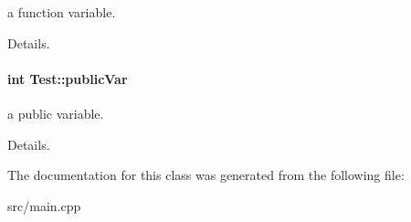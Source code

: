 a function variable. 

Details. \hypertarget{classTest_a3085f973ef857d85d647bf04e89760d0}{
\paragraph[{public\-Var}]{\setlength{\rightskip}{0pt plus 5cm}int Test\-::public\-Var}}\label{classTest_a3085f973ef857d85d647bf04e89760d0}


a public variable. 

Details. 

The documentation for this class was generated from the following file\-:\begin{DoxyCompactItemize}
\item 
src/main.\-cpp\end{DoxyCompactItemize}
